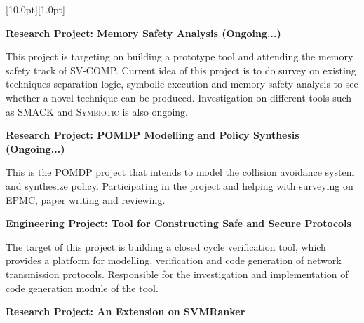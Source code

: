 \documentclass[12pt,a4paper,utf8]{report}
\begin{document}
\newpage
\begin{minipage}[t]{16cm}
    \colorbox{subtitlecolor}{\raisebox{0pt}[10.0pt][1.0pt]{
        \textcolor{white}{\textsf{}}}}
\end{minipage}\par
\vspace{0.2cm}\hspace{0.5cm}
\begin{minipage}[t]{15cm}
	{\textbf{Research Project: Memory Safety Analysis (Ongoing...)} }\par
    \qquad\qquad\qquad\qquad\qquad\qquad{}\par
    \quad  This project is targeting on building a prototype tool and attending the memory safety track of SV-COMP. Current idea of this project is to do survey on existing techniques separation logic, symbolic execution and memory safety analysis to see whether a novel technique can be produced. Investigation on different tools such as \textsc{SMACK} and \textsc{Symbiotic} is also ongoing.\par
    \vspace{0.2cm}
	{\textbf{Research Project: POMDP Modelling and  Policy Synthesis (Ongoing...)} }\par
    \qquad\qquad\qquad\qquad\qquad\qquad{}\par
    \quad  This is the POMDP project that intends to model the collision avoidance system and synthesize policy. Participating in the project and helping with surveying on EPMC, paper writing and reviewing.\par
    \vspace{0.2cm}
    {\textbf{Engineering Project: Tool for Constructing Safe and Secure Protocols}}\par
    \qquad\qquad\qquad\qquad\qquad\qquad{}\par
    \quad The target of this project is building a closed cycle verification tool, which provides a platform for modelling, verification and code generation of network transmission protocols. Responsible for the investigation and implementation of code generation module of the tool. \par
    \vspace{0.2cm}
    {\textbf{Research Project: An Extension on SVMRanker }}\par
    \qquad\qquad\qquad\qquad\qquad\qquad{}\par

\end{minipage}
\end{document}
